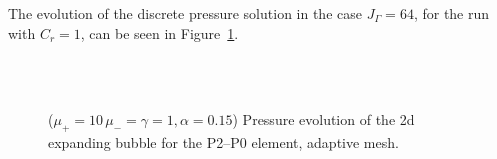 The evolution of the discrete pressure solution in the case $J_\Gamma = 64$, for
the run with $C_r = 1$, can be seen in
Figure~\ref{fig:expanding_bubble_adaptive}.
\begin{figure}[htbp]
\centering
{}\\
\\
\caption[Stokes expanding bubble pressure adaptive mesh]
{($\mu_+ = 10\,\mu_- = \gamma = 1,\alpha = 0.15$) Pressure evolution of
the 2d expanding bubble for the P2--P0 element, adaptive mesh.}
\label{fig:expanding_bubble_adaptive}
\end{figure}

